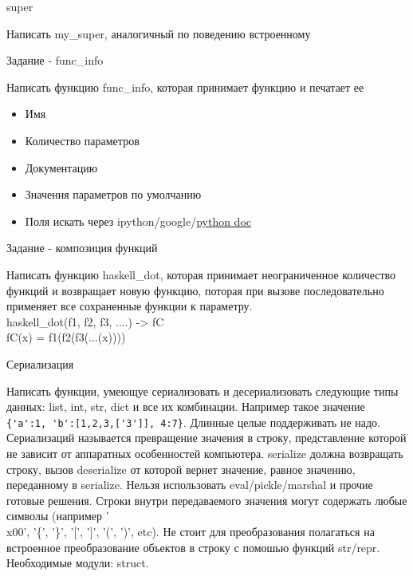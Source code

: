 \documentclass{article}
\begin{document}
\begin{center} super \end{center}
Написать my\_super, аналогичный по поведению встроенному 
\newpage

\begin{center} Задание - func\_info \end{center}
    Написать функцию func\_info, которая принимает функцию и печатает ее
    \begin{itemize}
        \item Имя
        \item Количество параметров
        \item Документацию
        \item Значения параметров по умолчанию
        \item Поля искать через ipython/google/\href{http://docs.python.org/reference/datamodel.html}{python doc}
    \end{itemize}
\newpage

\begin{center}Задание - композиция функций\end{center}
    Написать функцию haskell\_dot, которая принимает неограниченное количество функций
    и возвращает новую функцию, поторая при вызове последовательно применяет все 
    сохраненные функции к параметру. \\

    haskell\_dot(f1, f2, f3, ....) -> fC \\
    fC(x) = f1(f2(f3(...(x))))
\newpage

\begin{center} Сериализация \end{center}
Написать функции, умеющуе сериализовать и десериализовать следующие типы данных:
list, int, str, dict и все их комбинации. Например такое значение
\lstinline!{'a':1, 'b':[1,2,3,['3']], 4:7}!. Длинные целые поддерживать не надо.
Сериализаций называется превращение значения в строку, представление которой не 
зависит от аппаратных особенностей компьютера. serialize должна возвращать строку,
вызов deserialize от которой вернет значение, равное значению, переданному в 
serialize. Нельзя использовать eval/pickle/marshal и прочие готовые решения.
Строки внутри передаваемого значения могут содержать любые символы (например
'\\x00', '\{', '\}', '[', ']', '(', ')', etc). Не стоит для преобразования 
полагаться на встроенное преобразование объектов в строку с помошью функций 
str/repr. 
Необходимые модули: struct. 
\newpage
\end{document}
